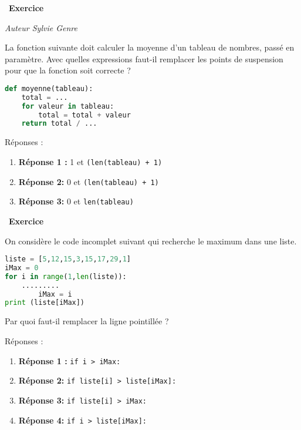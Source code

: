 \documentclass[
  11pt,
]{article}
\newcommand{\passthrough}[1]{#1}
\providecommand{\tightlist}{%
  \setlength{\itemsep}{0pt}\setlength{\parskip}{0pt}}
\newcounter{exo}
\newenvironment{exercice}[1]
{\par \medskip   \addtocounter{exo}{1} \noindent  
\begin{bclogo}[arrondi =0.1,   noborder = true, logo=\bccrayon, marge=4]{~\textbf{Exercice} \textbf{\theexo} {\itshape #1} }  \par}
{
\end{bclogo}
 \par \bigskip }
\newcounter{def}
\begin{document}
\begin{exercice}{}

\emph{Auteur Sylvie Genre}

La fonction suivante doit calculer la moyenne d'un tableau de nombres,
passé en paramètre. Avec quelles expressions faut-il remplacer les
points de suspension pour que la fonction soit correcte ?

\begin{lstlisting}[language=Python]
def moyenne(tableau):
    total = ...
    for valeur in tableau:
        total = total + valeur
    return total / ...
\end{lstlisting}

Réponses :

\begin{enumerate}
\def\labelenumi{\arabic{enumi}.}
\tightlist
\item
  \textbf{Réponse 1 :} 1 et \passthrough{\lstinline!(len(tableau) + 1)!}
\item
  \textbf{Réponse 2:} 0 et \passthrough{\lstinline!(len(tableau) + 1)!}
\item
  \textbf{Réponse 3:} 0 et \passthrough{\lstinline!len(tableau)!}
\end{enumerate}

\end{exercice}

\begin{exercice}{}

On considère le code incomplet suivant qui recherche le maximum dans une
liste.

\begin{lstlisting}[language=Python]
liste = [5,12,15,3,15,17,29,1]
iMax = 0
for i in range(1,len(liste)):
    .........
        iMax = i
print (liste[iMax])
\end{lstlisting}

Par quoi faut-il remplacer la ligne pointillée ?

Réponses :

\begin{enumerate}
\def\labelenumi{\arabic{enumi}.}
\tightlist
\item
  \textbf{Réponse 1 :} \passthrough{\lstinline!if i > iMax:!}
\item
  \textbf{Réponse 2:}
  \passthrough{\lstinline!if liste[i] > liste[iMax]:!}
\item
  \textbf{Réponse 3:} \passthrough{\lstinline!if liste[i] > iMax:!}
\item
  \textbf{Réponse 4:} \passthrough{\lstinline!if i > liste[iMax]:!}
\end{enumerate}

\end{exercice}
\end{document}

